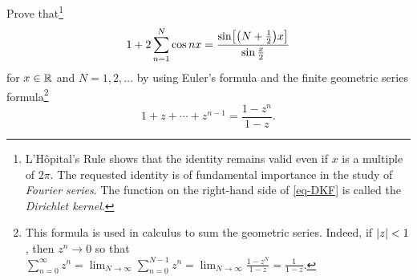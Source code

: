 \documentclass{../math135}
\begin{document}
\begin{exercise}
	Prove that\footnote{L'H\^opital's Rule shows that the identity
    remains valid even if \(x\) is a multiple of \(2\pi\).  The
    requested identity is of fundamental importance in the study of
    \emph{Fourier series}.  The function on the right-hand side of
    \eqref{eq-DKF} is called the \emph{Dirichlet kernel}.}
  \[
		1 + 2 \sum_{n=1}^N \cos nx
    = \frac{\sin \sbr*{\prn*{N + \frac 1 2} x}}{\sin \frac{x}{2}}
    \label{eq-DKF}
  \]
	for \(x \in \mathbb R\) and \(N = 1,2,\ldots\) by using Euler's formula
  and the finite geometric series formula\footnote{This formula is
    used in calculus to sum the geometric series.  Indeed, if
    \(\lvert z\rvert < 1\), then \(z^n \to 0\) so that
    \(\sum_{n=0}^{\infty} z^n = \lim_{N\to\infty} \sum_{n=0}^{N-1} z^n
    = \lim_{N\to\infty}\frac{1 - z^N}{1-z} = \frac{1}{1-z}\).}
	\begin{equation*}
		1+ z + \cdots + z^{n-1} = \frac{1-z^n}{1-z}.
	\end{equation*}

  \begin{solution}
  \end{solution}

\end{exercise}
\end{document}
